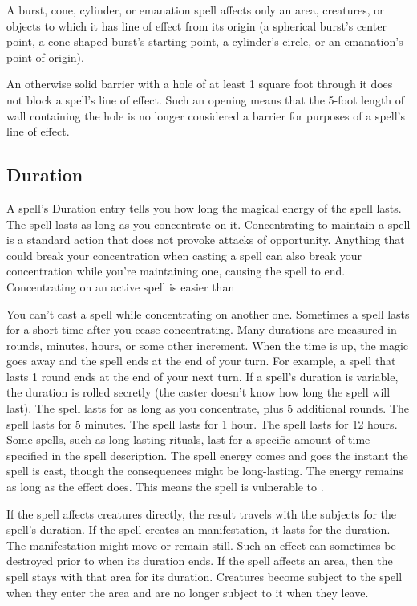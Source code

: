 A burst, cone, cylinder, or emanation spell affects only an area, creatures, or objects to which it has line of effect from its origin (a spherical burst's center point, a cone-shaped burst's starting point, a cylinder's circle, or an emanation's point of origin).

An otherwise solid barrier with a hole of at least 1 square foot through it does not block a spell's line of effect. Such an opening means that the 5-foot length of wall containing the hole is no longer considered a barrier for purposes of a spell's line of effect.

\subsection{Duration}
A spell's Duration entry tells you how long the magical energy of the spell lasts.
 The spell lasts as long as you concentrate on it. Concentrating to maintain a spell is a standard action that does not provoke attacks of opportunity. Anything that could break your concentration when casting a spell can also break your concentration while you're maintaining one, causing the spell to end. Concentrating on an active spell is easier than

You can't cast a spell while concentrating on another one. Sometimes a spell lasts for a short time after you cease concentrating.
 Many durations are measured in rounds, minutes, hours, or some other increment. When the time is up, the magic goes away and the spell ends at the end of your turn. For example, a spell that lasts 1 round ends at the end of your next turn. If a spell's duration is variable, the duration is rolled secretly (the caster doesn't know how long the spell will last).
 The spell lasts for as long as you concentrate, plus 5 additional rounds.
 The spell lasts for 5 minutes.
 The spell lasts for 1 hour.
 The spell lasts for 12 hours.
 Some spells, such as long-lasting rituals, last for a specific amount of time specified in the spell description.
 The spell energy comes and goes the instant the spell is cast, though the consequences might be long-lasting.
 The energy remains as long as the effect does. This means the spell is vulnerable to .

 If the spell affects creatures directly, the result travels with the subjects for the spell's duration. If the spell creates an manifestation, it lasts for the duration. The manifestation might move or remain still. Such an effect can sometimes be destroyed prior to when its duration ends. If the spell affects an area, then the spell stays with that area for its duration. Creatures become subject to the spell when they enter the area and are no longer subject to it when they leave.

